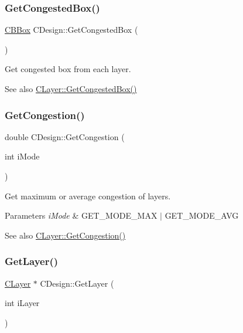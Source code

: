 \subsubsection{\texorpdfstring{GetCongestedBox()}{GetCongestedBox()}}
{\footnotesize\ttfamily \mbox{\hyperlink{classCBBox}{C\+B\+Box}} C\+Design\+::\+Get\+Congested\+Box (\begin{DoxyParamCaption}{ }\end{DoxyParamCaption})}



Get congested box from each layer. 

\begin{DoxySeeAlso}{See also}
\mbox{\hyperlink{classCLayer_aa4c718690f42ddb1adb4ace397264efc}{C\+Layer\+::\+Get\+Congested\+Box()}} 
\end{DoxySeeAlso}
\mbox{\label{classCDesign_a18f8be6fd29a69a897bc98c5e4b880b6}} 
\subsubsection{\texorpdfstring{GetCongestion()}{GetCongestion()}}
{\footnotesize\ttfamily double C\+Design\+::\+Get\+Congestion (\begin{DoxyParamCaption}\item[{int}]{i\+Mode }\end{DoxyParamCaption})}



Get maximum or average congestion of layers. 


\begin{DoxyParams}{Parameters}
{\em i\+Mode} & G\+E\+T\+\_\+\+M\+O\+D\+E\+\_\+\+M\+AX $\vert$ G\+E\+T\+\_\+\+M\+O\+D\+E\+\_\+\+A\+VG \\
\hline
\end{DoxyParams}
\begin{DoxySeeAlso}{See also}
\mbox{\hyperlink{classCLayer_a1cf9df5ef7dbe809239709f04e0a0cad}{C\+Layer\+::\+Get\+Congestion()}} 
\end{DoxySeeAlso}
\mbox{\label{classCDesign_a33e73f8a75aa2198ff498f7f67633e9a}} 
\subsubsection{\texorpdfstring{GetLayer()}{GetLayer()}}
{\footnotesize\ttfamily \mbox{\hyperlink{classCLayer}{C\+Layer}} $\ast$ C\+Design\+::\+Get\+Layer (\begin{DoxyParamCaption}\item[{int}]{i\+Layer }\end{DoxyParamCaption})}



